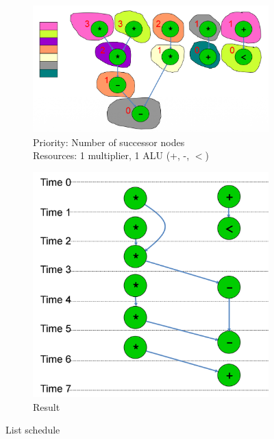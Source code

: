 \begin{figure}[h]
	\begin{center}
	\begin{subfigure}[b]{0.55\textwidth}
		\includegraphics[width=\textwidth]{images/List_scheduling_graph.png}
		\caption{Priority: Number of successor nodes \\
		Resources: 1 multiplier, 1 ALU (+, -, $<$)}
		\label{fig:list_scheduling_graph}
	\end{subfigure}
	\hfill
	\begin{subfigure}[b]{0.35\textwidth}
		\includegraphics[width=\textwidth]{images/List_scheduling.png}
		\caption{Result}
		\label{fig:list_scheduling}
	\end{subfigure}
	\caption{List schedule}
	\end{center}
\end{figure}

